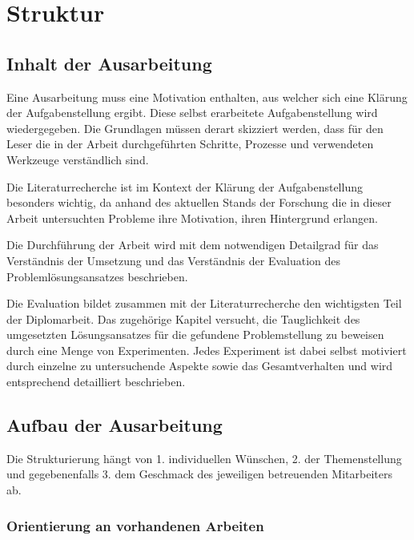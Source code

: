 \chapter{Struktur}

\section{Inhalt der Ausarbeitung}

Eine Ausarbeitung muss eine Motivation enthalten, aus welcher sich eine Klärung der Aufgabenstellung ergibt.
Diese selbst erarbeitete Aufgabenstellung wird wiedergegeben.
Die Grundlagen müssen derart skizziert werden, dass für den Leser die in der Arbeit durchgeführten Schritte, Prozesse und verwendeten Werkzeuge verständlich sind.

Die Literaturrecherche ist im Kontext der Klärung der Aufgabenstellung besonders wichtig, da anhand des aktuellen Stands der Forschung die in dieser Arbeit untersuchten Probleme ihre Motivation, ihren Hintergrund erlangen.

Die Durchführung der Arbeit wird mit dem notwendigen Detailgrad für das Verständnis der Umsetzung und das Verständnis der Evaluation des Problemlösungsansatzes beschrieben.

Die Evaluation bildet zusammen mit der Literaturrecherche den wichtigsten Teil der Diplomarbeit.
Das zugehörige Kapitel versucht, die Tauglichkeit des umgesetzten Lösungsansatzes für die gefundene Problemstellung zu beweisen durch eine Menge von Experimenten.
Jedes Experiment ist dabei selbst motiviert durch einzelne zu untersuchende Aspekte sowie das Gesamtverhalten und wird entsprechend detailliert beschrieben.


\section {Aufbau der Ausarbeitung}

Die Strukturierung hängt von 1. individuellen Wünschen, 2. der Themenstellung und gegebenenfalls 3. dem Geschmack des jeweiligen betreuenden Mitarbeiters ab.

\subsection{Orientierung an vorhandenen Arbeiten}

